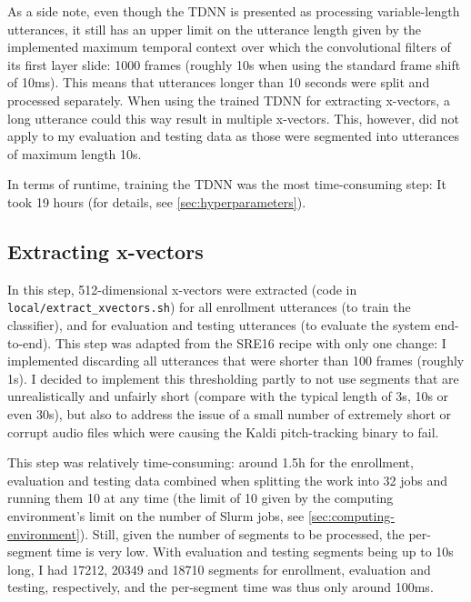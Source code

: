 \documentclass[bsc,frontabs,twoside,singlespacing,parskip,deptreport]{infthesis}
\begin{document}
{{{      As a side note, even though the TDNN is presented as processing variable-length utterances, it still has an upper limit on the utterance length given by the implemented maximum temporal context over which the convolutional filters of its first layer slide: 1000 frames (roughly 10s when using the standard frame shift of 10ms). This means that utterances longer than 10 seconds were split and processed separately. When using the trained TDNN for extracting x-vectors, a long utterance could this way result in multiple x-vectors. This, however, did not apply to my evaluation and testing data as those were segmented into utterances of maximum length 10s.
      
      In terms of runtime, training the TDNN was the most time-consuming step: It took 19 hours (for details, see \autoref{sec:hyperparameters}).
    }

    \subsection{Extracting x-vectors}{
      \label{sec:extracting-x-vectors}
      In this step, 512-dimensional x-vectors were extracted (code in \verb|local/extract_xvectors.sh|)  for all enrollment utterances (to train the classifier), and for evaluation and testing utterances (to evaluate the system end-to-end).
      This step was adapted from the SRE16 recipe with only one change: I implemented discarding all utterances that were shorter than 100 frames (roughly 1s). I decided to implement this thresholding partly to not use segments that are unrealistically and unfairly short (compare with the typical length of 3s, 10s or even 30s), but also to address the issue of a small number of extremely short or corrupt audio files which were causing the Kaldi pitch-tracking binary to fail.

      This step was relatively time-consuming: around 1.5h for the enrollment, evaluation and testing data combined when splitting the work into 32 jobs and running them 10 at any time (the limit of 10 given by the computing environment's limit on the number of Slurm jobs, see \autoref{sec:computing-environment}). Still, given the number of segments to be processed, the per-segment time is very low. With evaluation and testing segments being up to 10s long, I had 17212, 20349 and 18710 segments for enrollment, evaluation and testing, respectively, and the per-segment time was thus only around 100ms.
    }

}}
\end{document}
